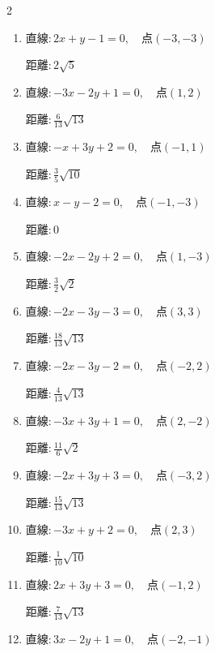 \begin{multicols}{2}
\begin{enumerate}
        $\displaystyle 距離 : \frac{4}{5}\sqrt{10}$

  \item $直線:2x+y-1=0,\quad 点 ( -3, -3 )$

        $\displaystyle 距離 : 2\sqrt{5}$

  \item $直線:-3x-2y+1=0,\quad 点 ( 1, 2 )$

        $\displaystyle 距離 : \frac{6}{13}\sqrt{13}$

\columnbreak %

  \item $直線:-x+3y+2=0,\quad 点 ( -1, 1 )$

        $\displaystyle 距離 : \frac{3}{5}\sqrt{10}$

  \item $直線:x-y-2=0,\quad 点 ( -1, -3 )$

        $\displaystyle 距離 : 0$

  \item $直線:-2x-2y+2=0,\quad 点 ( 1, -3 )$

        $\displaystyle 距離 : \frac{3}{2}\sqrt{2}$

  \item $直線:-2x-3y-3=0,\quad 点 ( 3, 3 )$

        $\displaystyle 距離 : \frac{18}{13}\sqrt{13}$

  \item $直線:-2x-3y-2=0,\quad 点 ( -2, 2 )$

        $\displaystyle 距離 : \frac{4}{13}\sqrt{13}$

  \item $直線:-3x+3y+1=0,\quad 点 ( 2, -2 )$

        $\displaystyle 距離 : \frac{11}{6}\sqrt{2}$

  \item $直線:-2x+3y+3=0,\quad 点 ( -3, 2 )$

        $\displaystyle 距離 : \frac{15}{13}\sqrt{13}$

  \item $直線:-3x+y+2=0,\quad 点 ( 2, 3 )$

        $\displaystyle 距離 : \frac{1}{10}\sqrt{10}$

  \item $直線:2x+3y+3=0,\quad 点 ( -1, 2 )$

        $\displaystyle 距離 : \frac{7}{13}\sqrt{13}$

  \item $直線:3x-2y+1=0,\quad 点 ( -2, -1 )$


\end{enumerate}
\end{multicols}
